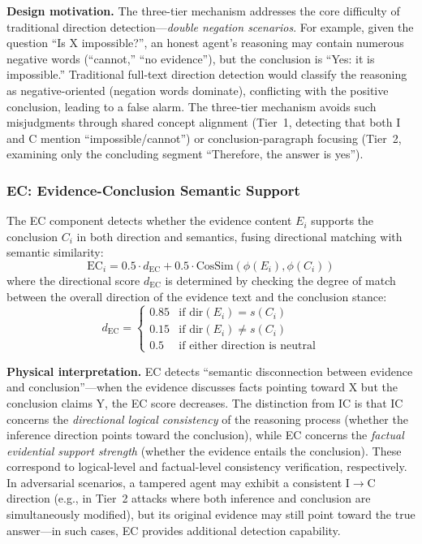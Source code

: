 \documentclass[12pt,a4paper]{article}
\begin{document}
\textbf{Design motivation.} The three-tier mechanism addresses the core difficulty of traditional direction detection---\textit{double negation scenarios}. For example, given the question ``Is X impossible?'', an honest agent's reasoning may contain numerous negative words (``cannot,'' ``no evidence''), but the conclusion is ``Yes: it is impossible.'' Traditional full-text direction detection would classify the reasoning as negative-oriented (negation words dominate), conflicting with the positive conclusion, leading to a false alarm. The three-tier mechanism avoids such misjudgments through shared concept alignment (Tier~1, detecting that both I and C mention ``impossible/cannot'') or conclusion-paragraph focusing (Tier~2, examining only the concluding segment ``Therefore, the answer is yes'').

\subsubsection{EC: Evidence-Conclusion Semantic Support}

The EC component detects whether the evidence content $E_i$ supports the conclusion $C_i$ in both direction and semantics, fusing directional matching with semantic similarity:
\begin{equation}\label{eq:ec}
\text{EC}_i = 0.5 \cdot d_{\text{EC}} + 0.5 \cdot \text{CosSim}(\phi(E_i), \phi(C_i))
\end{equation}
where the directional score $d_{\text{EC}}$ is determined by checking the degree of match between the overall direction of the evidence text and the conclusion stance:
\begin{equation}
d_{\text{EC}} = \begin{cases}
0.85 & \text{if } \text{dir}(E_i) = s(C_i) \\
0.15 & \text{if } \text{dir}(E_i) \neq s(C_i) \\
0.5 & \text{if either direction is neutral}
\end{cases}
\end{equation}

\textbf{Physical interpretation.} EC detects ``semantic disconnection between evidence and conclusion''---when the evidence discusses facts pointing toward X but the conclusion claims Y, the EC score decreases. The distinction from IC is that IC concerns the \textit{directional logical consistency} of the reasoning process (whether the inference direction points toward the conclusion), while EC concerns the \textit{factual evidential support strength} (whether the evidence entails the conclusion). These correspond to logical-level and factual-level consistency verification, respectively. In adversarial scenarios, a tampered agent may exhibit a consistent I$\to$C direction (e.g., in Tier~2 attacks where both inference and conclusion are simultaneously modified), but its original evidence may still point toward the true answer---in such cases, EC provides additional detection capability.
\end{document}
